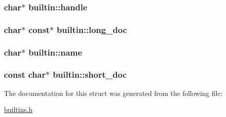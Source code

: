 \subsubsection[{\texorpdfstring{handle}{handle}}]{\setlength{\rightskip}{0pt plus 5cm}char$\ast$ builtin\+::handle}\hypertarget{structbuiltin_ac691203d59944ccbe8f0118abdd221e3}{}\label{structbuiltin_ac691203d59944ccbe8f0118abdd221e3}
\subsubsection[{\texorpdfstring{long\+\_\+doc}{long_doc}}]{\setlength{\rightskip}{0pt plus 5cm}char$\ast$ const$\ast$ builtin\+::long\+\_\+doc}\hypertarget{structbuiltin_a41b55325fbb47cfc0b9be49cc7510735}{}\label{structbuiltin_a41b55325fbb47cfc0b9be49cc7510735}
\subsubsection[{\texorpdfstring{name}{name}}]{\setlength{\rightskip}{0pt plus 5cm}char$\ast$ builtin\+::name}\hypertarget{structbuiltin_a66ae19dbf9a3fec9c0872c66b6bfcba7}{}\label{structbuiltin_a66ae19dbf9a3fec9c0872c66b6bfcba7}
\subsubsection[{\texorpdfstring{short\+\_\+doc}{short_doc}}]{\setlength{\rightskip}{0pt plus 5cm}const char$\ast$ builtin\+::short\+\_\+doc}\hypertarget{structbuiltin_acd7ac42244b07bafa4fbab01b6318d79}{}\label{structbuiltin_acd7ac42244b07bafa4fbab01b6318d79}


The documentation for this struct was generated from the following file\+:\begin{DoxyCompactItemize}
\item 
\hyperlink{builtins_8h}{builtins.\+h}\end{DoxyCompactItemize}
